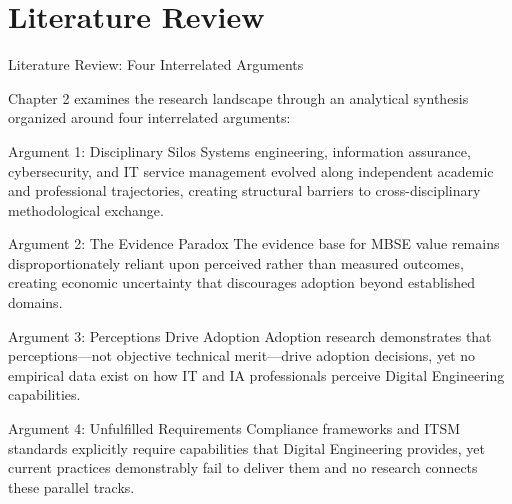 \documentclass{beamer}
\begin{document}
\section{Literature Review}
\begin{frame}[allowframebreaks]{Literature Review: Four Interrelated Arguments}
  \begin{small}
    Chapter 2 examines the research landscape through an analytical synthesis organized around four interrelated arguments:

    \vspace{0.3cm}
    \begin{block}{Argument 1: Disciplinary Silos}
      Systems engineering, information assurance, cybersecurity, and IT service management evolved along independent academic and professional trajectories, creating structural barriers to cross-disciplinary methodological exchange.
    \end{block}

    \begin{block}{Argument 2: The Evidence Paradox}
      The evidence base for MBSE value remains disproportionately reliant upon perceived rather than measured outcomes, creating economic uncertainty that discourages adoption beyond established domains.
    \end{block}

    \vspace{1.0cm}

    \begin{block}{Argument 3: Perceptions Drive Adoption}
      Adoption research demonstrates that perceptions---not objective technical merit---drive adoption decisions, yet no empirical data exist on how IT and IA professionals perceive Digital Engineering capabilities.
    \end{block}

    \begin{block}{Argument 4: Unfulfilled Requirements}
      Compliance frameworks and ITSM standards explicitly require capabilities that Digital Engineering provides, yet current practices demonstrably fail to deliver them and no research connects these parallel tracks.
    \end{block}
  \end{small}
\end{frame}
\end{document}
